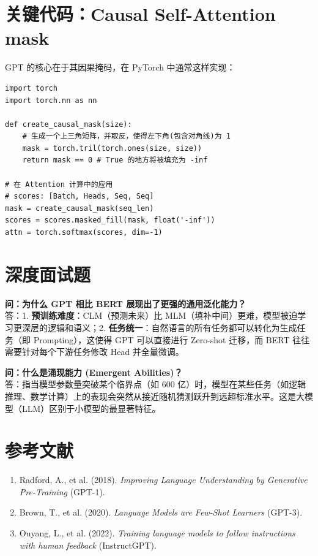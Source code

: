 \documentclass[12pt, a4paper]{book}
\begin{document}
\section{关键代码：Causal Self-Attention mask}
GPT 的核心在于其因果掩码，在 PyTorch 中通常这样实现：
\begin{lstlisting}
import torch
import torch.nn as nn

def create_causal_mask(size):
    # 生成一个上三角矩阵，并取反，使得左下角(包含对角线)为 1
    mask = torch.tril(torch.ones(size, size))
    return mask == 0 # True 的地方将被填充为 -inf

# 在 Attention 计算中的应用
# scores: [Batch, Heads, Seq, Seq]
mask = create_causal_mask(seq_len)
scores = scores.masked_fill(mask, float('-inf'))
attn = torch.softmax(scores, dim=-1)
\end{lstlisting}

\section{深度面试题}

\textbf{问：为什么 GPT 相比 BERT 展现出了更强的通用泛化能力？}\\
答：1. \textbf{预训练难度}：CLM（预测未来）比 MLM（填补中间）更难，模型被迫学习更深层的逻辑和语义；2. \textbf{任务统一}：自然语言的所有任务都可以转化为生成任务（即 Prompting），这使得 GPT 可以直接进行 Zero-shot 迁移，而 BERT 往往需要针对每个下游任务修改 Head 并全量微调。

\textbf{问：什么是涌现能力 (Emergent Abilities)？}\\
答：指当模型参数量突破某个临界点（如 600 亿）时，模型在某些任务（如逻辑推理、数学计算）上的表现会突然从接近随机猜测跃升到远超标准水平。这是大模型（LLM）区别于小模型的最显著特征。

\section{参考文献}
\begin{enumerate}
    \item Radford, A., et al. (2018). \textit{Improving Language Understanding by Generative Pre-Training} (GPT-1).
    \item Brown, T., et al. (2020). \textit{Language Models are Few-Shot Learners} (GPT-3).
    \item Ouyang, L., et al. (2022). \textit{Training language models to follow instructions with human feedback} (InstructGPT).
\end{enumerate}
\end{document}
